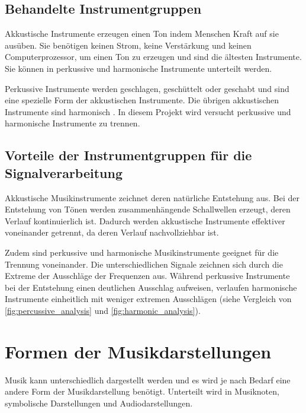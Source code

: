 \subsection{Behandelte Instrumentgruppen}

Akkustische Instrumente erzeugen einen Ton indem Menschen Kraft auf sie ausüben. Sie benötigen keinen Strom, keine Verstärkung und keinen Computerprozessor, um einen Ton zu erzeugen und sind die ältesten Instrumente. Sie können in perkussive und harmonische Instrumente unterteilt werden. 

\par

Perkussive Instrumente werden geschlagen, geschüttelt oder geschabt und sind eine spezielle Form der akkustischen Instrumente. Die übrigen akkustischen Instrumente sind harmonisch \parencite{acoustic_electric_digital_instruments}. In diesem Projekt wird versucht perkussive und harmonische Instrumente zu trennen.

%
\subsection{Vorteile der Instrumentgruppen für die Signalverarbeitung}
%

Akkustische Musikinstrumente zeichnet deren natürliche Entstehung aus. Bei der Entstehung von Tönen werden zusammenhängende Schallwellen erzeugt, deren Verlauf kontinuierlich ist. Dadurch werden akkustische Instrumente effektiver voneinander getrennt, da deren Verlauf nachvollziehbar ist.

\par

Zudem sind perkussive und harmonische Musikinstrumente geeignet für die Trennung voneinander. Die unterschiedlichen Signale zeichnen sich durch die Extreme der Ausschläge der Frequenzen aus. Während perkussive Instrumente bei der Entstehung einen deutlichen Ausschlag aufweisen, verlaufen harmonische Instrumente einheitlich mit weniger extremen Ausschlägen (siehe Vergleich von \cref{fig:percussive_analysis} und \cref{fig:harmonic_analysis}).

%
\section{Formen der Musikdarstellungen}
%

Musik kann unterschiedlich dargestellt werden und es wird je nach Bedarf eine andere Form der Musikdarstellung benötigt. Unterteilt wird in Musiknoten, symbolische Darstellungen und Audiodarstellungen.


